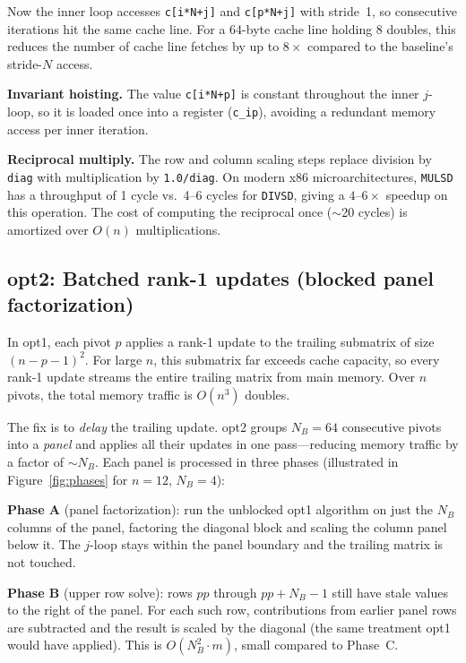 \documentclass[10pt,leqno]{amsart}
\begin{document}
Now the inner loop accesses \texttt{c[i*N+j]} and \texttt{c[p*N+j]} with 
stride~1, so consecutive iterations hit the same cache line. For a 64-byte 
cache line holding 8 doubles, this reduces the number of cache line fetches 
by up to $8\times$ compared to the baseline's stride-$N$ access.

\noindent\textbf{Invariant hoisting.} The value \texttt{c[i*N+p]} is 
constant throughout the inner $j$-loop, so it is loaded once into a register 
(\texttt{c\_ip}), avoiding a redundant memory access per inner iteration.

\noindent\textbf{Reciprocal multiply.} The row and column scaling steps 
replace division by \texttt{diag} with multiplication by \texttt{1.0/diag}. 
On modern x86 microarchitectures, \texttt{MULSD} has a throughput of 1 cycle 
vs.\ 4--6 cycles for \texttt{DIVSD}, giving a $4$--$6\times$ speedup on this 
operation. The cost of computing the reciprocal once ($\sim$20 cycles) is 
amortized over $O(n)$ multiplications.

\subsection{opt2: Batched rank-1 updates (blocked panel factorization)}
 
\noindent In opt1, each pivot $p$ applies a rank-1 update to the trailing
submatrix of size $(n-p-1)^2$. For large $n$, this submatrix far exceeds
cache capacity, so every rank-1 update streams the entire trailing matrix
from main memory. Over $n$ pivots, the total memory traffic is $O(n^3)$
doubles.
 
The fix is to \emph{delay} the trailing update. opt2 groups
$N_B = 64$ consecutive pivots into a \emph{panel} and applies all their
updates in one pass---reducing memory traffic by a factor of $\sim N_B$.
Each panel is processed in three phases (illustrated in
Figure~\ref{fig:phases} for $n=12$, $N_B=4$):
 
\noindent\textbf{Phase A} (panel factorization): run the unblocked opt1
algorithm on just the $N_B$ columns of the panel, factoring the diagonal
block and scaling the column panel below it. The $j$-loop stays within
the panel boundary and the trailing matrix is not touched.
 
\noindent\textbf{Phase B} (upper row solve): rows $pp$ through
$pp{+}N_B{-}1$ still have stale values to the right of the panel. For
each such row, contributions from earlier panel rows are subtracted and
the result is scaled by the diagonal (the same treatment opt1 would
have applied). This is $O(N_B^2 \cdot m)$, small compared to Phase~C.
 
\end{document}
